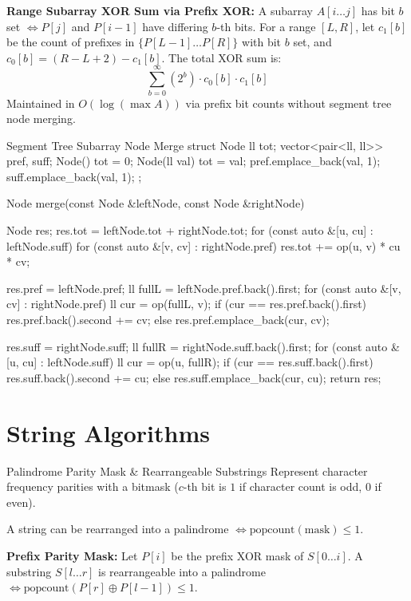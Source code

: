 \documentclass[10pt]{article}
\newcommand{\complexity}[1]{%
  \tcbox[on line,
    colback=tagbg,
    colframe=tagbg,
    boxrule=0pt,
    arc=2pt,
    boxsep=0pt,
    left=3.5pt, right=3.5pt, top=1.5pt, bottom=1.5pt
  ]{\color{tagtext}\scriptsize\bfseries\ensuremath{#1}}%
}
\begin{document}
\begin{resultbox}
    \textbf{Range Subarray XOR Sum via Prefix XOR:} 
    A subarray $A[i \dots j]$ has bit $b$ set $\iff P[j]$ and $P[i-1]$ have differing $b$-th bits. For a range $[L, R]$, let $c_1[b]$ be the count of prefixes in $\{P[L-1] \dots P[R]\}$ with bit $b$ set, and $c_0[b] = (R - L + 2) - c_1[b]$. The total XOR sum is:
    \[ \sum_{b=0}^{\infty} (2^b) \cdot c_0[b] \cdot c_1[b] \]
    Maintained in $O(\log(\max A))$ via prefix bit counts without segment tree node merging.
\end{resultbox}

\begin{vscode}{Segment Tree Subarray Node Merge \complexity{O(\log^2(\max A))}}
struct Node
{
    ll tot;
    vector<pair<ll, ll>> pref, suff;
    Node() { tot = 0; }
    Node(ll val) 
    { 
        tot = val; 
        pref.emplace_back(val, 1);
        suff.emplace_back(val, 1);
    }
};

Node merge(const Node &leftNode, const Node &rightNode)
{
    Node res;
    res.tot = leftNode.tot + rightNode.tot;
    for (const auto &[u, cu] : leftNode.suff)
    {
        for (const auto &[v, cv] : rightNode.pref)
            res.tot += op(u, v) * cu * cv;
    }

    res.pref = leftNode.pref;
    ll fullL = leftNode.pref.back().first;
    for (const auto &[v, cv] : rightNode.pref)
    {
        ll cur = op(fullL, v);
        if (cur == res.pref.back().first)
            res.pref.back().second += cv;
        else
            res.pref.emplace_back(cur, cv);
    }

    res.suff = rightNode.suff;
    ll fullR = rightNode.suff.back().first;
    for (const auto &[u, cu] : leftNode.suff)
    {
        ll cur = op(u, fullR);
        if (cur == res.suff.back().first)
            res.suff.back().second += cu;
        else
            res.suff.emplace_back(cur, cu);
    }
    return res;
}
\end{vscode}

\newpage
\section{String Algorithms}

\begin{conceptbox}{Palindrome Parity Mask \& Rearrangeable Substrings}
    Represent character frequency parities with a bitmask ($c$-th bit is $1$ if character count is odd, $0$ if even).
    \begin{resultbox}
        A string can be rearranged into a palindrome $\iff \text{popcount}(\text{mask}) \le 1$.
    \end{resultbox}
    \textbf{Prefix Parity Mask:} Let $P[i]$ be the prefix XOR mask of $S[0 \dots i]$. A substring $S[l \dots r]$ is rearrangeable into a palindrome $\iff \text{popcount}(P[r] \oplus P[l - 1]) \le 1$.
\end{conceptbox}
\end{document}
